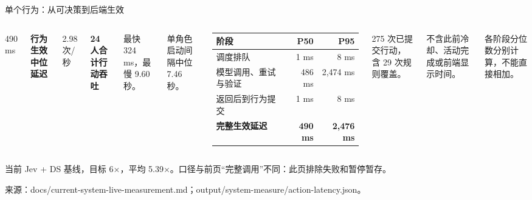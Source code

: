 \documentclass[aspectratio=169,10pt,fontset=fandol]{ctexbeamer}
\newcommand{\source}[1]{\vfill{\fontsize{6.3}{8}\selectfont\color{Muted}#1\par}}
\newcommand{\key}[1]{\textbf{\color{Forest}#1}}
\newcommand{\jev}[1]{\textbf{\color{Jev}#1}}
\begin{document}
\begin{frame}{单个行为：从可决策到后端生效}
\begin{columns}[T,onlytextwidth]
{\fontsize{31}{36}\selectfont\color{Jev}490 ms}\par
\key{行为生效中位延迟}\par\bigskip
{\fontsize{27}{33}\selectfont\color{Forest}2.98 次/秒}\par
\key{24 人合计行动吞吐}\par\medskip
{\small 最快 324 ms，最慢 9.60 秒。\par 单角色启动间隔中位 7.46 秒。}
{\small\begin{tabularx}{\linewidth}{@{}Yrr@{}}\toprule
\key{阶段} & \key{P50} & \key{P95}\\\midrule
调度排队 & 1 ms & 8 ms\\
模型调用、重试与验证 & 486 ms & 2,474 ms\\
返回后到行为提交 & 1 ms & 8 ms\\\midrule
\key{完整生效延迟} & \jev{490 ms} & \jev{2,476 ms}\\\bottomrule
\end{tabularx}}\par\medskip
{\small 275 次已提交行动，含 29 次规则覆盖。\par 不含此前冷却、活动完成或前端显示时间。\par 各阶段分位数分别计算，不能直接相加。}
\end{columns}
\source{当前 Jev + DS 基线，目标 6×，平均 5.39×。口径与前页“完整调用”不同：此页排除失败和暂停暂存。\par 来源：docs/current-system-live-measurement.md；output/system-measure/action-latency.json。}
\end{frame}
\end{document}
